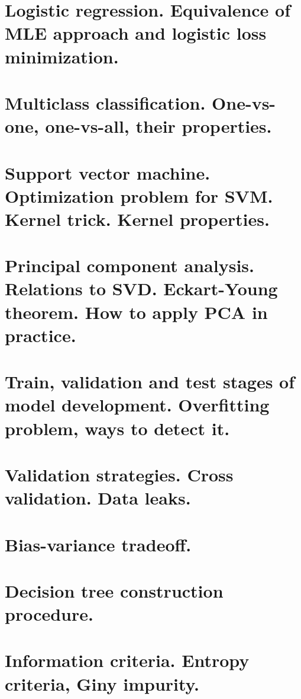 \section{Logistic regression. Equivalence of MLE approach and logistic loss minimization.}


\section{Multiclass classification. One-vs-one, one-vs-all, their properties.}


\section{Support vector machine. Optimization problem for SVM. Kernel trick. Kernel properties.}


\section{Principal component analysis. Relations to SVD. Eckart-Young theorem. How to apply PCA in practice.}


\section{Train, validation and test stages of model development. Overfitting problem, ways to detect it.}


\section{Validation strategies. Cross validation. Data leaks.} 


\section{Bias-variance tradeoff.}


\section{Decision tree construction procedure.}


\section{Information criteria. Entropy criteria, Giny impurity.}



